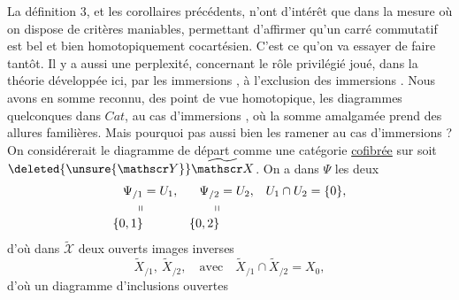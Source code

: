 La définition 3, et les corollaires précédents, n'ont d'intérêt que dans la mesure où on dispose de critères maniables, permettant d'affirmer qu'un carré commutatif est bel et bien homotopiquement cocartésien. C'est ce qu'on va essayer de faire tantôt. Il y a aussi une perplexité, concernant le rôle privilégié joué, dans la théorie développée ici, par les immersions , à l'exclusion des immersions . Nous avons en somme  reconnu, des
point de vue homotopique, les diagrammes quelconques
dans $\mathit{Cat}$, au cas  d'immersions , où la somme amalgamée prend des allures familières. Mais pourquoi pas aussi bien les ramener au cas d'immersions  ? On considérerait  le diagramme de départ comme  une catégorie \uline{cofibrée} sur
soit $\deleted{\unsure{\mathscr Y}}\widetilde{\mathscr X}$. On a dans $\Psi$ les deux 
\[
\begin{aligned}
\Psi_{/1}&=U_1,&\Psi_{/2}&=U_2,&U_1\cap U_2&=\{0\},\\[-2pt]
\shortparallel&&\shortparallel\\[-2pt]
\{0,1\}&&\{0,2\}
\end{aligned}
\]
d'où dans $\widetilde{\mathscr X}$ deux ouverts images inverses
\[
\widetilde X_{/1},\ \widetilde X_{/2},\quad\text{avec}\quad \widetilde X_{/1}\cap\widetilde X_{/2}=X_0 ,
\]
d'où un diagramme  d'inclusions ouvertes
